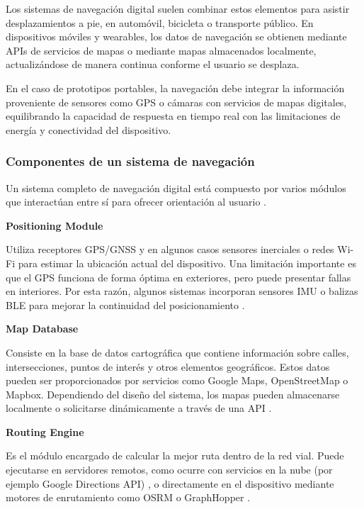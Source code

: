 Los sistemas de navegación digital suelen combinar estos elementos para asistir desplazamientos a pie, en automóvil, bicicleta o transporte público. En dispositivos móviles y wearables, los datos de navegación se obtienen mediante APIs de servicios de mapas o mediante mapas almacenados localmente, actualizándose de manera continua conforme el usuario se desplaza.\cite{google_directions_api}

En el caso de prototipos portables, la navegación debe integrar la información proveniente de sensores como GPS o cámaras con servicios de mapas digitales, equilibrando la capacidad de respuesta en tiempo real con las limitaciones de energía y conectividad del dispositivo.

\subsubsection{Componentes de un sistema de navegación}

Un sistema completo de navegación digital está compuesto por varios módulos que interactúan entre sí para ofrecer orientación al usuario \cite{navigation_systems_book}.

\textbf{Positioning Module}

Utiliza receptores GPS/GNSS y en algunos casos sensores inerciales o redes Wi-Fi para estimar la ubicación actual del dispositivo. Una limitación importante es que el GPS funciona de forma óptima en exteriores, pero puede presentar fallas en interiores. Por esta razón, algunos sistemas incorporan sensores IMU o balizas BLE para mejorar la continuidad del posicionamiento \cite{zbotic_gnss,indoor_navigation_googlemaps}.

\textbf{Map Database}

Consiste en la base de datos cartográfica que contiene información sobre calles, intersecciones, puntos de interés y otros elementos geográficos. Estos datos pueden ser proporcionados por servicios como Google Maps, OpenStreetMap o Mapbox. Dependiendo del diseño del sistema, los mapas pueden almacenarse localmente o solicitarse dinámicamente a través de una API \cite{openstreetmap_about,google_directions_api}.

\textbf{Routing Engine}

Es el módulo encargado de calcular la mejor ruta dentro de la red vial. Puede ejecutarse en servidores remotos, como ocurre con servicios en la nube (por ejemplo Google Directions API) \cite{google_directions_api}, o directamente en el dispositivo mediante motores de enrutamiento como OSRM o GraphHopper \cite{luxen2011osrm}.

